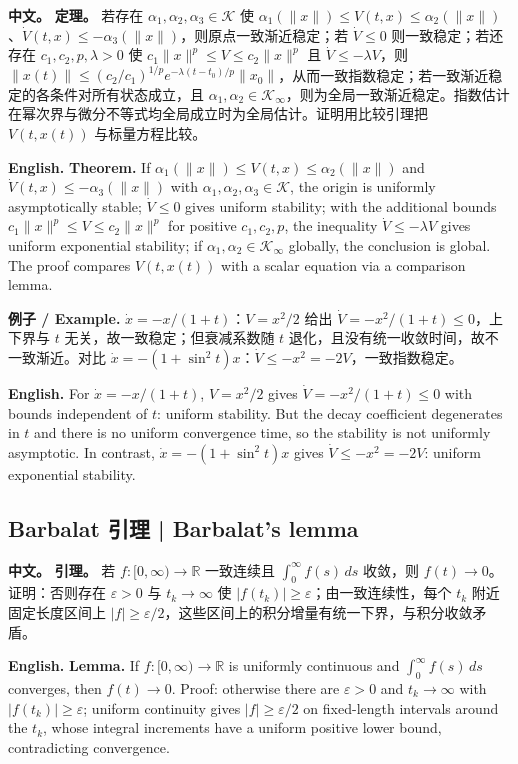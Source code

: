 \documentclass[UTF8,11pt,a4paper]{ctexart}
\newcommand{\EN}[1]{\par\noindent\textbf{English.} #1\par}
\newcommand{\EX}[2]{\par\noindent\textbf{例子 / Example.} #1\par\EN{#2}}
\newcommand{\APS}[2]{\par\noindent\textbf{中文。} #1\par\noindent\textbf{English.} #2\par}
\newcommand{\R}{\mathbb{R}}\newcommand{\N}{\mathbb{N}}
\newcommand{\norm}[1]{\lVert #1\rVert}\newcommand{\abs}[1]{\lvert #1\rvert}
\begin{document}
\APS{\textbf{定理。} 若存在 $\alpha_1,\alpha_2,\alpha_3\in\mathcal K$ 使 $\alpha_1(\norm{x})\le V(t,x)\le\alpha_2(\norm{x})$、$\dot V(t,x)\le-\alpha_3(\norm{x})$，则原点一致渐近稳定；若 $\dot V\le0$ 则一致稳定；若还存在 $c_1,c_2,p,\lambda>0$ 使 $c_1\norm{x}^p\le V\le c_2\norm{x}^p$ 且 $\dot V\le-\lambda V$，则 $\norm{x(t)}\le(c_2/c_1)^{1/p}e^{-\lambda(t-t_0)/p}\norm{x_0}$，从而一致指数稳定；若一致渐近稳定的各条件对所有状态成立，且 $\alpha_1,\alpha_2\in\mathcal K_\infty$，则为全局一致渐近稳定。指数估计在幂次界与微分不等式均全局成立时为全局估计。证明用比较引理把 $V(t,x(t))$ 与标量方程比较。}{\textbf{Theorem.} If $\alpha_1(\norm{x})\le V(t,x)\le\alpha_2(\norm{x})$ and $\dot V(t,x)\le-\alpha_3(\norm{x})$ with $\alpha_1,\alpha_2,\alpha_3\in\mathcal K$, the origin is uniformly asymptotically stable; $\dot V\le0$ gives uniform stability; with the additional bounds $c_1\|x\|^p\le V\le c_2\|x\|^p$ for positive $c_1,c_2,p$, the inequality $\dot V\le-\lambda V$ gives uniform exponential stability; if $\alpha_1,\alpha_2\in\mathcal K_\infty$ globally, the conclusion is global. The proof compares $V(t,x(t))$ with a scalar equation via a comparison lemma.}

\EX{$\dot x=-x/(1+t)$：$V=x^2/2$ 给出 $\dot V=-x^2/(1+t)\le0$，上下界与 $t$ 无关，故一致稳定；但衰减系数随 $t$ 退化，且没有统一收敛时间，故不一致渐近。对比 $\dot x=-(1+\sin^2t)x$：$\dot V\le-x^2=-2V$，一致指数稳定。}{For $\dot x=-x/(1+t)$, $V=x^2/2$ gives $\dot V=-x^2/(1+t)\le0$ with bounds independent of $t$: uniform stability. But the decay coefficient degenerates in $t$ and there is no uniform convergence time, so the stability is not uniformly asymptotic. In contrast, $\dot x=-(1+\sin^2t)x$ gives $\dot V\le-x^2=-2V$: uniform exponential stability.}

\subsection{Barbalat 引理 | Barbalat's lemma}
\APS{\textbf{引理。} 若 $f:[0,\infty)\to\R$ 一致连续且 $\int_0^\infty f(s)\,ds$ 收敛，则 $f(t)\to0$。证明：否则存在 $\varepsilon>0$ 与 $t_k\to\infty$ 使 $\abs{f(t_k)}\ge\varepsilon$；由一致连续性，每个 $t_k$ 附近固定长度区间上 $\abs{f}\ge\varepsilon/2$，这些区间上的积分增量有统一下界，与积分收敛矛盾。}{\textbf{Lemma.} If $f:[0,\infty)\to\R$ is uniformly continuous and $\int_0^\infty f(s)\,ds$ converges, then $f(t)\to0$. Proof: otherwise there are $\varepsilon>0$ and $t_k\to\infty$ with $\abs{f(t_k)}\ge\varepsilon$; uniform continuity gives $\abs{f}\ge\varepsilon/2$ on fixed-length intervals around the $t_k$, whose integral increments have a uniform positive lower bound, contradicting convergence.}
\end{document}

